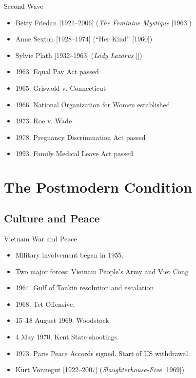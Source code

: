 \begin{frame}{Second Wave}
	\begin{itemize}
		\item<+->Betty Friedan [1921--2006] (\emph{The Feminine Mystique} [1963])
		\item<+->Anne Sexton [1928--1974] (``Her Kind'' [1960])
		\item<+->Sylvie Plath [1932--1963] (\emph{Lady Lazarus} [])
		\item<+->1963. Equal Pay Act passed
		\item<+->1965. Griswold v. Connecticut
		\item<+->1966. National Organization for Women established
		\item<+->1973. Roe v. Wade
		\item<+->1978. Pregnancy Discrimination Act passed
		\item<+->1993. Family Medical Leave Act passed
	\end{itemize}

\end{frame}

\timeout

\section{The Postmodern Condition}
\subsection{Culture and Peace}
\begin{frame}{Vietnam War and Peace}
	\begin{itemize}
		\item<+->Military involvement began in 1955.
		\item<+->Two major forces: Vietnam People's Army and Viet Cong
		\item<+->1964. Gulf of Tonkin resolution and escalation
		\item<+->1968. Tet Offensive.
		\item<+->15--18 August 1969. Woodstock
		\item<+->4 May 1970. Kent State shootings.
		\item<+->1973. Paris Peace Accords signed. Start of US withdrawal.
		\item<+->Kurt Vonnegut [1922--2007] (\emph{Slaughterhouse-Five} [1969])
	\end{itemize}
\end{frame}

